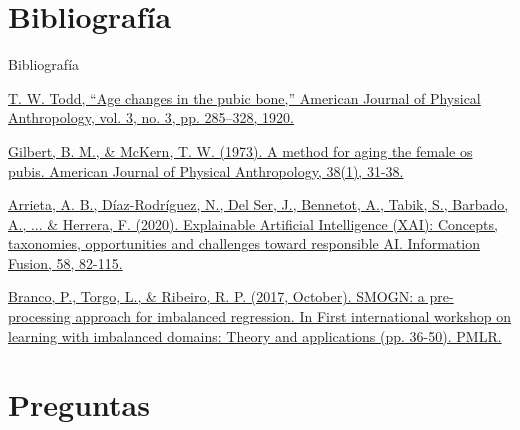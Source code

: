 \documentclass{beamer}
\begin{document}
\section{Bibliografía}
\begin{frame}[allowframebreaks]{Bibliografía}

\begin{thebibliography}{9}


	\href{https://onlinelibrary.wiley.com/doi/abs/10.1002/ajpa.1330030301}{\scriptsize T. W. Todd, “Age changes in the pubic bone,” American Journal of Physical Anthropology, vol. 3, no. 3, pp. 285–328, 1920.}


	\href{https://onlinelibrary.wiley.com/doi/abs/10.1002/ajpa.1330380109}{\scriptsize Gilbert, B. M., \& McKern, T. W. (1973). A method for aging the female os pubis. American Journal of Physical Anthropology, 38(1), 31-38.}


	\href{https://www.sciencedirect.com/science/article/pii/S1566253519308103}{\scriptsize Arrieta, A. B., Díaz-Rodríguez, N., Del Ser, J., Bennetot, A., Tabik, S., Barbado, A., ... \& Herrera, F. (2020). Explainable Artificial Intelligence (XAI): Concepts, taxonomies, opportunities and challenges toward responsible AI. Information Fusion, 58, 82-115.}


	\href{http://proceedings.mlr.press/v74/branco17a/branco17a.pdf}{\scriptsize Branco, P., Torgo, L., \& Ribeiro, R. P. (2017, October). SMOGN: a pre-processing approach for imbalanced regression. In First international workshop on learning with imbalanced domains: Theory and applications (pp. 36-50). PMLR.}

\end{thebibliography}


\end{frame}


\section{Preguntas}
\end{document}
